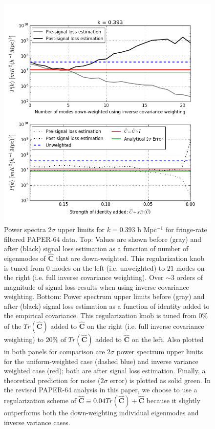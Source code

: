 \documentclass[preprint2,numberedappendix,tighten]{aastex6}  %
\begin{document}
\begin{figure}
	\centering
	\includegraphics[width=1\textwidth]{plots/sigloss_modeloop_2panel.png}
	\caption{Power spectra $2\sigma$ upper limits for $k=0.393$ h Mpc$^{-1}$ for fringe-rate filtered PAPER-64 data. Top: Values 
are shown before (gray) and after (black) signal loss estimation as a function of number of eigenmodes of $\widehat{\textbf{C}}$ that 
are down-weighted. This regularization knob is tuned from $0$ modes on the left (i.e. unweighted) to $21$ modes on the right (i.e. full inverse 
covariance weighting). Over $\sim3$ orders of magnitude of signal loss results when using inverse covariance weighting. Bottom: Power spectrum upper limits before (gray) and after (black) signal loss estimation as a function of identity added to the empirical covariance. This regularization knob is tuned from $0\%$  of the $Tr(\widehat{\textbf{C}})$ added to $\widehat{\textbf{C}}$ on the right (i.e. full inverse covariance weighting) to $20\%$ of $Tr(\widehat{\textbf{C}})$ added to $\widehat{\textbf{C}}$ on the left. Also 
plotted in both panels for comparison are $2\sigma$ power spectrum upper limits for the uniform-weighted case (dashed blue) and inverse variance 
weighted case (red); both are after signal loss estimation. Finally, a theoretical prediction for noise ($2\sigma$ error) is plotted 
as solid green. In the revised PAPER-64 analysis in this paper, we choose to use a regularization scheme of $\widehat{\textbf{C}} \equiv 0.04Tr(\widehat{\textbf{C}}) + \widehat{\textbf{C}}$ because it slightly outperforms both the down-weighting individual eigenmodes and inverse variance cases.}
	\label{fig:sigloss_modeloop}
\end{figure}
\end{document}
